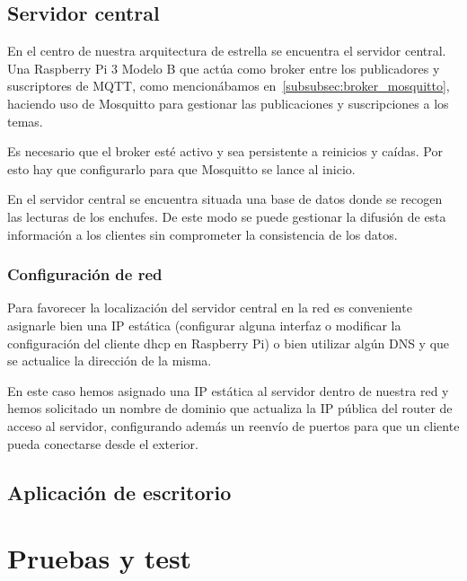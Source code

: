 \documentclass[a4paper,10pt]{article}
\begin{document}
\newpage

\subsection{Servidor central}\label{subsec:servidor-central}

En el centro de nuestra arquitectura de estrella se encuentra el
servidor central. Una Raspberry Pi 3 Modelo B que actúa como broker
entre los publicadores y suscriptores de MQTT, como mencionábamos
en~\ref{subsubsec:broker_mosquitto}, haciendo uso de Mosquitto para
gestionar las publicaciones y suscripciones a los temas.

Es necesario que el broker esté activo y sea persistente a reinicios y
caídas. Por esto hay que configurarlo para que Mosquitto se lance al
inicio.

En el servidor central se encuentra situada una base de datos donde se
recogen las lecturas de los enchufes. De este modo se puede gestionar
la difusión de esta información a los clientes sin comprometer la
consistencia de los datos.

\subsubsection{Configuración de red}

Para favorecer la localización del servidor central en la red es
conveniente asignarle bien una IP estática (configurar alguna interfaz
o modificar la configuración del cliente dhcp en Raspberry Pi) o bien
utilizar algún DNS y que se actualice la dirección de la misma.

En este caso hemos asignado una IP estática al servidor dentro de
nuestra red y hemos solicitado un nombre de dominio que actualiza la
IP pública del router de acceso al servidor, configurando además un
reenvío de puertos para que un cliente pueda conectarse desde el exterior.

\newpage

\subsection{Aplicación de escritorio}

\newpage

\section{Pruebas y test}

\newpage


 
\end{document}
